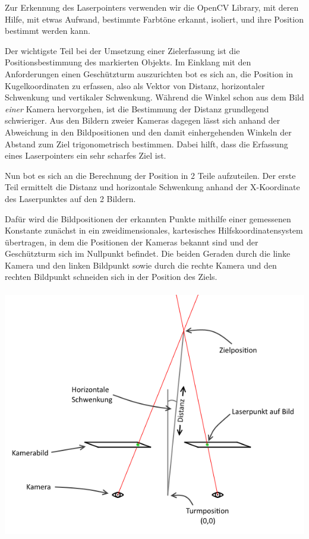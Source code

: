 \documentclass[12pt,a4paper]{article}
\begin{document}
Zur Erkennung des Laserpointers verwenden wir die OpenCV Library, mit deren Hilfe, mit etwas Aufwand, bestimmte Farbtöne erkannt, isoliert, und ihre Position bestimmt werden kann.

Der wichtigste Teil bei der Umsetzung einer Zielerfassung ist die Positionsbestimmung des markierten Objekts.
Im Einklang mit den Anforderungen einen Geschützturm auszurichten bot es sich an, die Position in Kugelkoordinaten zu erfassen, also als Vektor von Distanz, horizontaler Schwenkung und vertikaler Schwenkung.
Während die Winkel schon aus dem Bild \textit{einer} Kamera hervorgehen, ist die Bestimmung der Distanz grundlegend schwieriger. Aus den Bildern zweier Kameras dagegen lässt sich anhand der Abweichung in den Bildpositionen und den damit einhergehenden Winkeln der Abstand zum Ziel trigonometrisch bestimmen. Dabei hilft, dass die Erfassung eines Laserpointers ein sehr scharfes Ziel ist.

Nun bot es sich an die Berechnung der Position in 2 Teile aufzuteilen. Der erste Teil ermittelt die Distanz und horizontale Schwenkung anhand der X-Koordinate des Laserpunktes auf den 2 Bildern.

Dafür wird die Bildpositionen der erkannten Punkte mithilfe einer gemessenen Konstante zunächst in ein zweidimensionales,  kartesisches Hilfskoordinatensystem übertragen, in dem die Positionen der Kameras bekannt sind und der Geschützturm sich im Nullpunkt befindet. Die beiden Geraden durch die linke Kamera und den linken Bildpunkt sowie durch die rechte Kamera und den rechten Bildpunkt schneiden sich in der Position des Ziels.
\hfill\\
\hfill\\
\includegraphics[scale=0.85]{../Bilder/PosBestGraph.png} 
\end{document}
